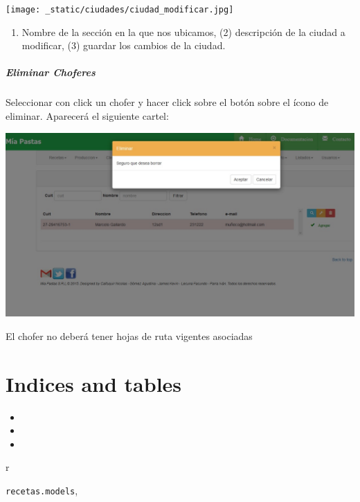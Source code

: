 \documentclass[letterpaper,10pt,english]{sphinxmanual}
\begin{document}
\texttt{[image: \_static/ciudades/ciudad\_modificar.jpg]}
\begin{enumerate}
\item {} 
Nombre de la sección en la que nos ubicamos, (2) descripción de la ciudad a modificar, (3)  guardar los cambios de la ciudad.

\end{enumerate}


\paragraph{{}Eliminar Choferes}
\label{choferes eliminar:eliminar-choferes}\label{choferes eliminar::doc}
Seleccionar con click un chofer y hacer click sobre el botón sobre el ícono de eliminar. Aparecerá el siguiente cartel:

\includegraphics{chofer_eliminar.jpg}

El chofer no deberá tener hojas de ruta vigentes asociadas


\chapter{Indices and tables}
\label{index:indices-and-tables}\begin{itemize}
\item {} 

\item {} 

\item {} 

\end{itemize}


\renewcommand{\indexname}{Python Module Index}
\begin{theindex}
\def\bigletter#1{{\Large\sffamily#1}\nopagebreak\vspace{1mm}}
\bigletter{r}
\item {\texttt{recetas.models}}, \pageref{codigo recetas:module-recetas.models}
\end{theindex}

\renewcommand{\indexname}{Index}
\printindex
\end{document}
